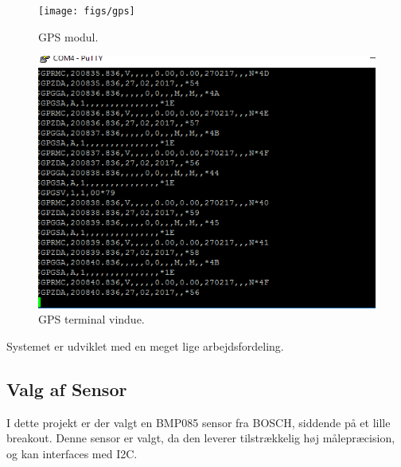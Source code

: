 \begin{figure}
	\centering
	\texttt{[image: figs/gps]}
	\caption{GPS modul.}
	\label{fig:gps}
\end{figure}

\begin{figure}
	\centering
	\includegraphics[width=0.7\linewidth]{figs/gps_terminal}
	\caption{GPS terminal vindue.}
	\label{fig:gps_terminal}
\end{figure}

Systemet er udviklet med en meget lige arbejdsfordeling.

\subsection{Valg af Sensor}
I dette projekt er der valgt en BMP085 sensor fra BOSCH, siddende på et lille breakout. Denne sensor er valgt, da den leverer tilstrækkelig høj målepræcision, og 
kan interfaces med I2C.
